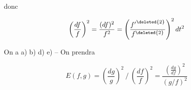 
donc

\[ \left(\frac{df}{f}\right)^2=\frac{(df)^2}{f^2}=\left(\frac{{f'}^{\deleted{2}}}{f^{\deleted{2}}}\right)^2dt^2 \]

On a a) b)  d) e) -- On prendra

\[ E(f,g)=\left(\frac{dg}{g}\right)^2\mathbin{/}\left(\frac{df}{f}\right)^2=\frac{\left(\frac{dg}{df}\right)^2}{(g/f)^2} \]


